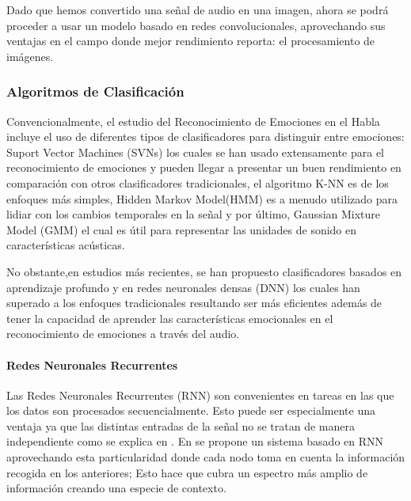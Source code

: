\documentclass[11pt,a4paper,spanish]{book}
\begin{document}
	Dado que hemos convertido una señal de audio en una imagen, ahora se podrá proceder a usar un modelo basado en redes convolucionales, aprovechando sus ventajas en el campo donde mejor rendimiento reporta: el procesamiento de imágenes.
	
	
	\subsubsection{Algoritmos de Clasificación}
	

	Convencionalmente, el estudio del Reconocimiento de Emociones en el Habla incluye el uso de diferentes tipos de clasificadores para distinguir entre emociones: Suport Vector Machines (SVNs) los cuales se han usado extensamente
	para el reconocimiento de emociones y pueden llegar a presentar un buen rendimiento en comparación con otros clasificadores tradicionales, el algoritmo K-NN es de los enfoques más simples, Hidden Markov Model(HMM) es a menudo utilizado para lidiar con los cambios temporales en la señal y por último, Gaussian Mixture Model (GMM) el cual es útil para representar las unidades de sonido en características acústicas.%
	
	
	No obstante,en estudios más recientes, se han propuesto clasificadores basados en aprendizaje profundo y en redes neuronales densas (DNN) los cuales han superado a los enfoques tradicionales resultando ser más eficientes además de tener la capacidad de aprender las características emocionales en el reconocimiento de emociones a través del audio.
	
	\paragraph{Redes Neuronales Recurrentes}\hfill \break
	Las Redes Neuronales Recurrentes (RNN) son convenientes en tareas en las que los datos son procesados secuencialmente. Esto puede ser especialmente una ventaja ya que las distintas entradas de la señal no se tratan de manera independiente como se explica en \cite{Lim2017}. En \cite{Lee2015} se propone un sistema basado en RNN aprovechando esta particularidad donde cada nodo toma en cuenta la información recogida en los anteriores; Esto hace que cubra un espectro más amplio de información creando una especie de contexto.
	
\end{document}
